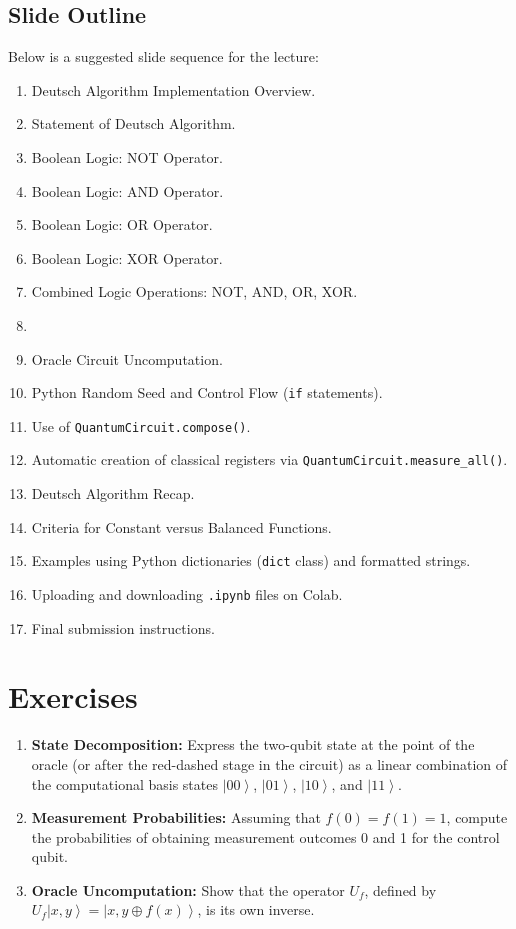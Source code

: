\documentclass[11pt,oneside]{book}
\theoremstyle{remark}
\renewcommand{\ket}[1]{\left|#1\right\rangle}
\begin{document}
	\section{Slide Outline}
	Below is a suggested slide sequence for the lecture:
	\begin{enumerate}[label=\textbf{Slide \arabic*:}, leftmargin=*, align=left]
		\item Deutsch Algorithm Implementation Overview.
		\item Statement of Deutsch Algorithm.
		\item Boolean Logic: NOT Operator.
		\item Boolean Logic: AND Operator.
		\item Boolean Logic: OR Operator.
		\item Boolean Logic: XOR Operator.
		\item Combined Logic Operations: NOT, AND, OR, XOR.
		\item {}
		\item Oracle Circuit Uncomputation.
		\item Python Random Seed and Control Flow (\texttt{if} statements).
		\item Use of \texttt{QuantumCircuit.compose()}.
		\item Automatic creation of classical registers via \texttt{QuantumCircuit.measure\_all()}.
		\item Deutsch Algorithm Recap.
		\item Criteria for Constant versus Balanced Functions.
		\item Examples using Python dictionaries (\texttt{dict} class) and formatted strings.
		\item Uploading and downloading \texttt{.ipynb} files on Colab.
		\item Final submission instructions.
	\end{enumerate}
	
	\chapter{Exercises}
	\begin{enumerate}[label=\textbf{Exercise \arabic*:}]
		\item \textbf{State Decomposition:}  
		Express the two-qubit state at the point of the oracle (or after the red-dashed stage in the circuit) as a linear combination of the computational basis states $\ket{00}$, $\ket{01}$, $\ket{10}$, and $\ket{11}$.
		\item \textbf{Measurement Probabilities:}  
		Assuming that $f(0)=f(1)=1$, compute the probabilities of obtaining measurement outcomes 0 and 1 for the control qubit.
		\item \textbf{Oracle Uncomputation:}  
		Show that the operator $U_f$, defined by $U_f\ket{x,y}=\ket{x,y\oplus f(x)}$, is its own inverse.
	\end{enumerate}
	
\end{document}
